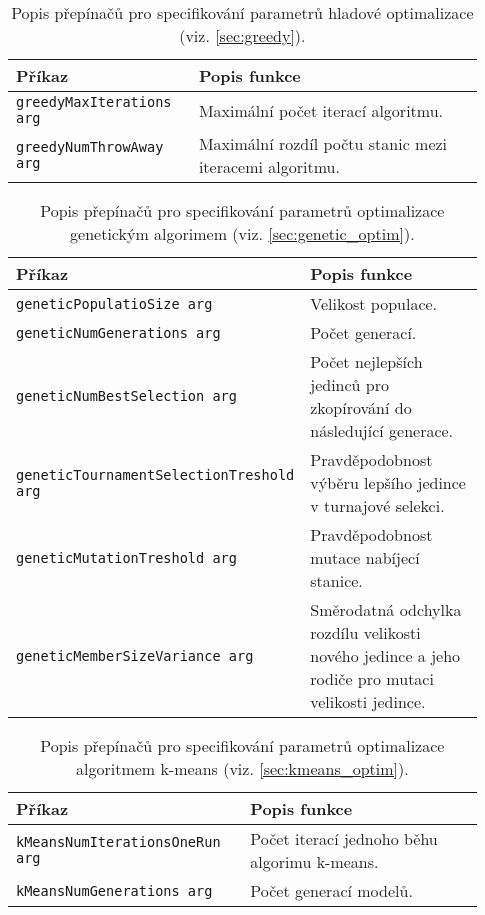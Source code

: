 \begin{table}
\centering\footnotesize\sf
\begin{tabular}{p{0.35\linewidth} p{0.58\linewidth}}
\toprule
Příkaz & Popis funkce \\
\midrule
\texttt{greedyMaxIterations arg} & Maximální počet iterací algoritmu. \\
\texttt{greedyNumThrowAway arg} & Maximální rozdíl počtu stanic mezi iteracemi algoritmu. \\
\bottomrule
\end{tabular}
\caption{Popis přepínačů pro specifikování parametrů hladové optimalizace (viz. \cref{sec:greedy}).}
\label{tab:prepinace_greedy}
\end{table}


\begin{table}
\centering\footnotesize\sf
\begin{tabular}{p{0.52\linewidth} p{0.41\linewidth}}
\toprule
Příkaz & Popis funkce \\
\midrule
\texttt{geneticPopulatioSize arg} & Velikost populace. \\
\texttt{geneticNumGenerations arg} & Počet generací. \\
\texttt{geneticNumBestSelection arg} & Počet nejlepších jedinců pro zkopírování
    do následující generace. \\
\texttt{geneticTournamentSelectionTreshold arg} & Pravděpodobnost výběru lepšího
    jedince v turnajové selekci. \\
\texttt{geneticMutationTreshold arg} & Pravděpodobnost mutace nabíjecí stanice. \\
\texttt{geneticMemberSizeVariance arg} & Směrodatná odchylka rozdílu velikosti 
    nového jedince a jeho rodiče pro mutaci velikosti jedince. \\
\bottomrule
\end{tabular}
\caption{Popis přepínačů pro specifikování parametrů optimalizace genetickým algorimem
    (viz. \cref{sec:genetic_optim}).}
\label{tab:prepinace_genetic}
\end{table}


\begin{table}
\centering\footnotesize\sf
\begin{tabular}{p{0.46\linewidth} p{0.47\linewidth}}
\toprule
Příkaz & Popis funkce \\
\midrule
\texttt{kMeansNumIterationsOneRun arg} & Počet iterací jednoho běhu algorimu k-means. \\
\texttt{kMeansNumGenerations arg} & Počet generací modelů. \\
\bottomrule
\end{tabular}
\caption{Popis přepínačů pro specifikování parametrů optimalizace algoritmem k-means 
    (viz. \cref{sec:kmeans_optim}).}
\label{tab:prepinace_kmeans}
\end{table}


